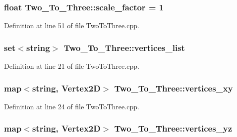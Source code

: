 \subsubsection[{\texorpdfstring{scale\+\_\+factor}{scale_factor}}]{\setlength{\rightskip}{0pt plus 5cm}float Two\+\_\+\+To\+\_\+\+Three\+::scale\+\_\+factor = 1}\hypertarget{class_two___to___three_a388e406a03a64b5422f1de36c138ecaa}{}\label{class_two___to___three_a388e406a03a64b5422f1de36c138ecaa}


Definition at line 51 of file Two\+To\+Three.\+cpp.

\subsubsection[{\texorpdfstring{vertices\+\_\+list}{vertices_list}}]{\setlength{\rightskip}{0pt plus 5cm}set$<$string$>$ Two\+\_\+\+To\+\_\+\+Three\+::vertices\+\_\+list}\hypertarget{class_two___to___three_a2f42478bfa5c2e759df2caac98e12b22}{}\label{class_two___to___three_a2f42478bfa5c2e759df2caac98e12b22}


Definition at line 21 of file Two\+To\+Three.\+cpp.

\subsubsection[{\texorpdfstring{vertices\+\_\+xy}{vertices_xy}}]{\setlength{\rightskip}{0pt plus 5cm}map$<$string, {\bf Vertex2D}$>$ Two\+\_\+\+To\+\_\+\+Three\+::vertices\+\_\+xy}\hypertarget{class_two___to___three_aa324b095f53b74973a1ed45d80bf401f}{}\label{class_two___to___three_aa324b095f53b74973a1ed45d80bf401f}


Definition at line 24 of file Two\+To\+Three.\+cpp.

\subsubsection[{\texorpdfstring{vertices\+\_\+yz}{vertices_yz}}]{\setlength{\rightskip}{0pt plus 5cm}map$<$string, {\bf Vertex2D}$>$ Two\+\_\+\+To\+\_\+\+Three\+::vertices\+\_\+yz}\hypertarget{class_two___to___three_a8052b332b93963257e5e1eff1acbf3f7}{}\label{class_two___to___three_a8052b332b93963257e5e1eff1acbf3f7}


